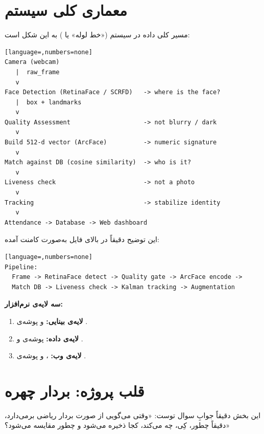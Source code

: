 \documentclass[12pt,a4paper]{article}
\begin{document}
\section{معماری کلی سیستم}
مسیر کلی داده در سیستم («خط لوله» یا ) به این شکل است:

\begin{latin}
\begin{lstlisting}[language=,numbers=none]
Camera (webcam)
   |  raw_frame
   v
Face Detection (RetinaFace / SCRFD)   -> where is the face?
   |  box + landmarks
   v
Quality Assessment                    -> not blurry / dark
   v
Build 512-d vector (ArcFace)          -> numeric signature
   v
Match against DB (cosine similarity)  -> who is it?
   v
Liveness check                        -> not a photo
   v
Tracking                              -> stabilize identity
   v
Attendance -> Database -> Web dashboard
\end{lstlisting}
\end{latin}

این توضیح دقیقاً در بالای فایل  به‌صورت کامنت آمده:

\begin{latin}
\begin{lstlisting}[language=,numbers=none]
Pipeline:
  Frame -> RetinaFace detect -> Quality gate -> ArcFace encode ->
  Match DB -> Liveness check -> Kalman tracking -> Augmentation
\end{lstlisting}
\end{latin}

\textbf{سه لایه‌ی نرم‌افزار:}
\begin{enumerate}[rightmargin=0pt]
  \item \textbf{لایه‌ی بینایی:}  و پوشه‌ی .
  \item \textbf{لایه‌ی داده:} پوشه‌ی  و .
  \item \textbf{لایه‌ی وب:} ،  و پوشه‌ی .
\end{enumerate}

\section{قلب پروژه: بردار چهره}
این بخش دقیقاً جوابِ سوال توست: «وقتی می‌گویی از صورت بردار ریاضی برمی‌دارد، دقیقاً چطور، کِی، چه می‌کند، کجا ذخیره می‌شود و چطور مقایسه می‌شود؟»
\end{document}
